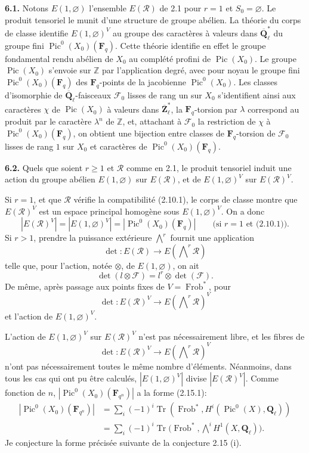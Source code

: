 \documentclass[11pt]{article}
\newcommand{\Fq}{\mathbf{F}_q}
\newcommand{\F}{\mathbf{F}}
\newcommand{\Qbl}{\overline{\mathbf{Q}}_{\ell}}
\newcommand{\Ql}{\mathbf{Q}_{\ell}}
\newcommand{\Zbl}{\overline{\mathbf{Z}}_{\ell}}
\newcommand{\Frob}{\operatorname{Frob}}
\newcommand{\Pic}{\operatorname{Pic}}
\newcommand{\Tr}{\operatorname{Tr}}
\newcommand{\Z}{\mathbb{Z}}
\newcommand{\para}[1]{\medskip\noindent\textbf{#1}\enspace}
\begin{document}
\para{6.1.} Notons \(E(1,\varnothing)\) l'ensemble \(E(\mathcal R)\) de 2.1 pour \(r=1\) et \(S_0=\varnothing\). Le produit tensoriel le munit d'une structure de groupe abélien. La théorie du corps de classe identifie \(E(1,\varnothing)^V\) au groupe des caractères à valeurs dans \(\Qbl^*\) du groupe fini \(\Pic^0(X_0)(\Fq)\). Cette théorie identifie en effet le groupe fondamental rendu abélien de \(X_0\) au complété profini de \(\Pic(X_0)\). Le groupe \(\Pic(X_0)\) s'envoie sur \(\Z\) par l'application degré, avec pour noyau le groupe fini \(\Pic^0(X_0)(\Fq)\) des \(\Fq\)-points de la jacobienne \(\Pic^0(X_0)\). Les classes d'isomorphie de \(\Qbl\)-faisceaux \(\mathcal F_0\) lisses de rang un sur \(X_0\) s'identifient ainsi aux caractères \(\chi\) de \(\Pic(X_0)\) à valeurs dans \(\Zbl^*\), la \(\Fq\)-torsion par \(\lambda\) correspond au produit par le caractère \(\lambda^n\) de \(\Z\), et, attachant à \(\mathcal F_0\) la restriction de \(\chi\) à \(\Pic^0(X_0)(\Fq)\), on obtient une bijection entre classes de \(\Fq\)-torsion de \(\mathcal F_0\) lisses de rang \(1\) sur \(X_0\) et caractères de \(\Pic^0(X_0)(\Fq)\).

\para{6.2.} Quels que soient \(r\geq 1\) et \(\mathcal R\) comme en 2.1, le produit tensoriel induit une action du groupe abélien \(E(1,\varnothing)\) sur \(E(\mathcal R)\), et de \(E(1,\varnothing)^V\) sur \(E(\mathcal R)^V\).

Si \(r=1\), et que \(\mathcal R\) vérifie la compatibilité (2.10.1), le corps de classe montre que \(E(\mathcal R)^V\) est un espace principal homogène sous \(E(1,\varnothing)^V\). On a donc
\begin{equation}
  |E(\mathcal R)^V|=|E(1,\varnothing)^V|=|\Pic^0(X_0)(\Fq)| \qquad \text{(si \(r=1\) et (2.10.1)).}
\tag{6.2.1}
\end{equation}
Si \(r>1\), prendre la puissance extérieure \(\bigwedge^r\) fournit une application
\[
  \det:E(\mathcal R)\longrightarrow E(\bigwedge\nolimits^r\mathcal R)
\]
telle que, pour l'action, notée \(\otimes\), de \(E(1,\varnothing)\), on ait
\[
  \det(l\otimes\mathcal F)=l^r\otimes\det(\mathcal F).
\]
De même, après passage aux points fixes de \(V=\Frob^*\), pour
\[
  \det:E(\mathcal R)^V\longrightarrow E(\bigwedge\nolimits^r\mathcal R)^V
\]
et l'action de \(E(1,\varnothing)^V\).

L'action de \(E(1,\varnothing)^V\) sur \(E(\mathcal R)^V\) n'est pas nécessairement libre, et les fibres de
\[
  \det:E(\mathcal R)^V\longrightarrow E(\bigwedge\nolimits^r\mathcal R)^V
\]
n'ont pas nécessairement toutes le même nombre d'éléments. Néanmoins, dans tous les cas qui ont pu être calculés, \(|E(1,\varnothing)^V|\) divise \(|E(\mathcal R)^V|\). Comme fonction de \(n\), \(|\Pic^0(X_0)(\F_{q^n})|\) a la forme (2.15.1):
\[
\begin{aligned}
|\Pic^0(X_0)(\F_{q^n})|
&=\sum_i(-1)^i\Tr(\Frob^*,H^i(\Pic^0(X),\Ql))\\
&=\sum_i(-1)^i\Tr\bigl(\Frob^*,\bigwedge\nolimits^iH^1(X,\Ql)\bigr).
\end{aligned}
\]
Je conjecture la forme précisée suivante de la conjecture 2.15 (i).
\end{document}
